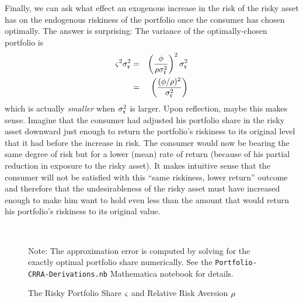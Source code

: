 Finally, we can ask what effect an exogenous increase in the risk of the
risky asset has on the endogenous riskiness of the portfolio once the consumer
has chosen optimally.  The answer is surprising: The variance of the optimally-chosen
portfolio is
\begin{eqnarray}
{\varsigma}^{2} \sigma^{2}_{\mathfrak{r}} & = & \left(\frac{\phi}{\rho \sigma_{\mathfrak{r}}^{2}}\right)^{2} \sigma^{2}_{\mathfrak{r}}
\\ & = & \left(\frac{(\phi/\rho)^{2}}{\sigma_{\mathfrak{r}}^{2}}\right)
\end{eqnarray}
which is actually {\it smaller} when $\sigma^{2}_{\mathfrak{r}}$ is larger.
Upon reflection, maybe this makes sense.  Imagine that the consumer
had adjusted his portfolio share in the risky asset downward just
enough to return the portfolio's riskiness to its original level that
it had before the increase in risk.  The consumer would now be bearing
the same degree of risk but for a lower (mean) rate of return (because
of his partial reduction in exposure to the risky asset).  It makes
intuitive sense that the consumer will not be satisfied with this
``same riskiness, lower return'' outcome and therefore that the
undesirableness of the risky asset must have increased enough to make
him want to hold even less than the amount that would return his
portfolio's riskiness to its original value.


\begin{figure}[h]
\caption{The Risky Portfolio Share ${\varsigma}$ and Relative Risk Aversion $\rho$} \label{fig:Port}\centering
{}\\
\vspace{.1in}  \begin{flushleft} \footnotesize Note: The approximation error is computed by solving for the exactly optimal
portfolio share numerically.  See the \texttt{Portfolio-CRRA-Derivations.nb} Mathematica notebook for details.
\end{flushleft}
\end{figure}

